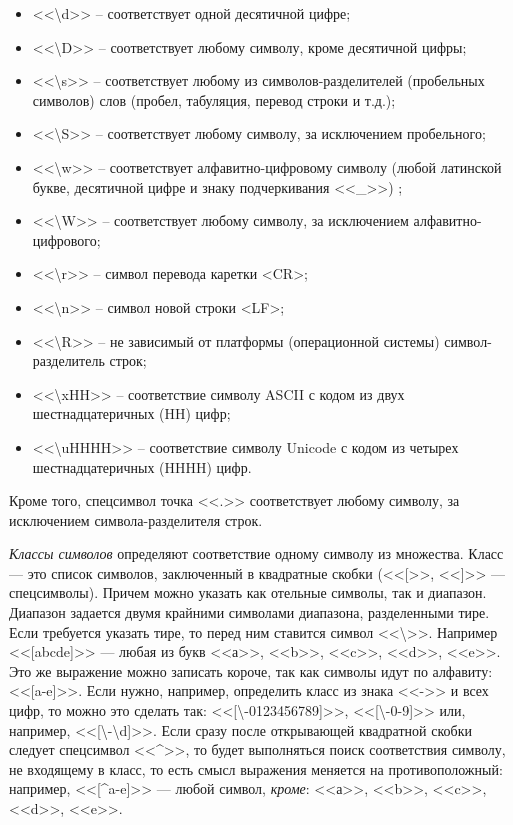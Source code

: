 \begin{itemize}
    \item <<\textbackslash d>> – соответствует одной десятичной цифре;
    \item <<\textbackslash D>> – соответствует любому символу, кроме десятичной цифры;
    \item <<\textbackslash s>> – соответствует любому из символов-разделителей (пробельных символов) слов (пробел, табуляция, перевод строки и т.д.);
    \item <<\textbackslash S>> – соответствует любому символу, за исключением пробельного;
    \item <<\textbackslash w>> – соответствует алфавитно-цифровому символу (любой латинской букве, десятичной цифре и знаку подчеркивания <<\_>>) ;
    \item <<\textbackslash W>> – соответствует любому символу, за исключением алфавитно-цифрового;
    \item <<\textbackslash r>>  – символ перевода каретки <CR>;
    \item <<\textbackslash n>>  – символ новой строки <LF>;
    \item <<\textbackslash R>>  – не зависимый от платформы (операционной системы) символ-разделитель строк;
    \item <<\textbackslash xHH>> – соответствие символу ASCII с кодом из двух шестнадцатеричных (HH) цифр;
    \item <<\textbackslash uHHHH>> – соответствие символу Unicode с кодом из четырех шестнадцатеричных (HHHH) цифр.
\end{itemize}

Кроме того, спецсимвол точка <<.>> соответствует любому символу, за исключением символа-разделителя строк.

\emph{Классы символов} определяют соответствие одному символу из множества. Класс --- это список символов, заключенный в квадратные скобки (<<[>>, <<]>> --- спецсимволы). Причем можно указать как отельные символы, так и диапазон. Диапазон задается двумя крайними символами диапазона, разделенными тире. Если требуется указать тире, то перед ним ставится символ <<\textbackslash>>. Например <<[abcde]>> --- любая из букв <<а>>, <<b>>, <<c>>, <<d>>, <<e>>. Это же выражение можно записать короче, так как символы идут по алфавиту: <<[a-e]>>. Если нужно, например, определить класс из знака <<->> и всех цифр, то можно это сделать так: <<[\textbackslash-0123456789]>>, <<[\textbackslash-0-9]>> или, например, <<[\textbackslash-\textbackslash d]>>. Если сразу после открывающей квадратной скобки следует спецсимвол <<\^{}>>, то будет выполняться поиск соответствия символу, не входящему в класс, то есть смысл выражения меняется на противоположный: например, <<[\^{}a-e]>> --- любой символ, \emph{кроме}: <<а>>, <<b>>, <<c>>, <<d>>, <<e>>.

